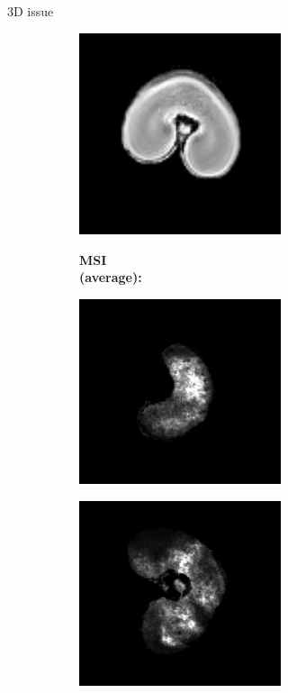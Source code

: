 \documentclass[10pt]{beamer}
\begin{document}
\begin{frame}{3D issue}
\begin{figure}[ht]
\begin{subfigure}[c]{0.3\textwidth}
       \includegraphics[width=0.65\textwidth]{fig/3D_density_aligned_manual0006}%
     \end{subfigure}
     \begin{subfigure}[b]{0.15\textwidth}  
       \textbf{MSI \\ (average):}%
     \end{subfigure}%
     \begin{subfigure}[c]{0.3\textwidth}
       \centering
       \includegraphics[width=0.65\textwidth]{fig/3D_segmentation0000}%
     \end{subfigure}%
     \begin{subfigure}[c]{0.3\textwidth}
       \centering
       \includegraphics[width=0.65\textwidth]{fig/3D_segmentation0003}%

\end{subfigure}
\end{figure}
\end{frame}
\end{document}
